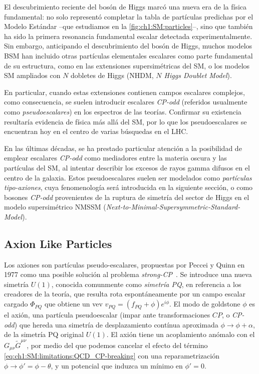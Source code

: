 El descubrimiento reciente del bosón de Higgs marcó una nueva era de la física fundamental: no solo representó completar la tabla de partículas predichas por el Modelo Estándar --que estudiamos en la \cref{fig:ch1:SM:particles}--, sino que también ha sido la primera resonancia fundamental escalar detectada experimentalmente. Sin embargo, anticipando el descubrimiento del bosón de Higgs, muchos modelos BSM han incluido otras partículas elementales escalares como parte fundamental de su estructura, como en las extensiones supersimétricas del SM, o los modelos SM ampliados con $N$ dobletes de Higgs (NHDM, \textit{$N$ Higgs Doublet Model}).

En particular, cuando estas extensiones contienen campos escalares complejos, como consecuencia, se suelen introducir escalares \textit{CP-odd} (referidos usualmente como \textit{pseudoescalares}) en los espectros de las teorías. Confirmar su existencia resultaría evidencia de física más allá del SM, por lo que los pseudoescalares se encuentran hoy en el centro de varias búsquedas en el LHC.

En las últimas décadas, se ha prestado particular atención a la posibilidad de emplear escalares \textit{CP-odd} como mediadores entre la materia oscura y las partículas del SM, al intentar describir los excesos de rayos gamma difusos en el centro de la galaxia. Estos pseudoescalares suelen ser modelados como \textit{partículas tipo-axiones}, cuya fenomenología será introducida en la siguiente sección, o como bosones \textit{CP-odd} provenientes de la ruptura de simetría del sector de Higgs en el modelo supersimétrico NMSSM (\textit{Next-to-Minimal-Supersymmetric-Standard-Model})\cites[-1em][]{Cheung2014}{Huang2014}.


\subsection{Axion Like Particles}

Los axiones son partículas pseudo-escalares, propuestas por Peccei y Quinn en 1977 como una posible solución al problema \textit{strong-CP}~\cite{Peccei1977,Peccei1977a}. Se introduce una nueva simetría $U(1)$, conocida comunmente como \textit{simetría PQ}, en referencia a los creadores de la teoría, que resulta rota espontáneamente por un campo escalar cargado $\Phi_{PQ}$ que obtiene un vev $v_{PQ} = (f_{PQ} + \phi) e^{i\phi}$. El modo de goldstone $\phi$ es el axión, una partícula pseudoescalar (impar ante transformaciones $CP$, o \textit{CP-odd}) que hereda una simetría de desplazamiento contínua aproximada $\phi \to \phi + \alpha$, de la simetría PQ original $U(1)$. El axión tiene un acoplamiento anómalo con el $G_{\mu\nu} \tilde{G}^{\mu\nu}$, por medio del que podemos cancelar el efecto del término \eqref{eq:ch1:SM:limitations:QCD_CP-breaking} con una reparametrización $\phi \to \phi' = \phi - \theta$, y un potencial que induzca un mínimo en $\phi' = 0$.

